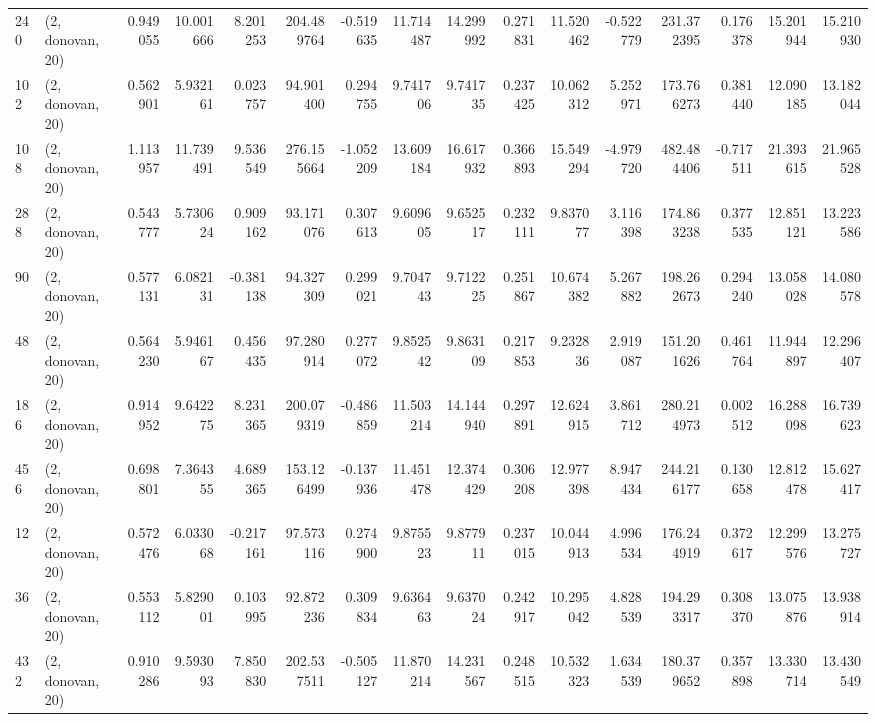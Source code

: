 \begin{tabular}{llrrrrrrrrrrrrrr}
240 &  (2, donovan, 20) &   0.949055 &  10.001666 &   8.201253 &   204.489764 &  -0.519635 &  11.714487 &  14.299992 &  0.271831 &  11.520462 &  -0.522779 &   231.372395 &   0.176378 &  15.201944 &  15.210930 \\
102 &  (2, donovan, 20) &   0.562901 &   5.932161 &   0.023757 &    94.901400 &   0.294755 &   9.741706 &   9.741735 &  0.237425 &  10.062312 &   5.252971 &   173.766273 &   0.381440 &  12.090185 &  13.182044 \\
108 &  (2, donovan, 20) &   1.113957 &  11.739491 &   9.536549 &   276.155664 &  -1.052209 &  13.609184 &  16.617932 &  0.366893 &  15.549294 &  -4.979720 &   482.484406 &  -0.717511 &  21.393615 &  21.965528 \\
288 &  (2, donovan, 20) &   0.543777 &   5.730624 &   0.909162 &    93.171076 &   0.307613 &   9.609605 &   9.652517 &  0.232111 &   9.837077 &   3.116398 &   174.863238 &   0.377535 &  12.851121 &  13.223586 \\
90  &  (2, donovan, 20) &   0.577131 &   6.082131 &  -0.381138 &    94.327309 &   0.299021 &   9.704743 &   9.712225 &  0.251867 &  10.674382 &   5.267882 &   198.262673 &   0.294240 &  13.058028 &  14.080578 \\
48  &  (2, donovan, 20) &   0.564230 &   5.946167 &   0.456435 &    97.280914 &   0.277072 &   9.852542 &   9.863109 &  0.217853 &   9.232836 &   2.919087 &   151.201626 &   0.461764 &  11.944897 &  12.296407 \\
186 &  (2, donovan, 20) &   0.914952 &   9.642275 &   8.231365 &   200.079319 &  -0.486859 &  11.503214 &  14.144940 &  0.297891 &  12.624915 &   3.861712 &   280.214973 &   0.002512 &  16.288098 &  16.739623 \\
456 &  (2, donovan, 20) &   0.698801 &   7.364355 &   4.689365 &   153.126499 &  -0.137936 &  11.451478 &  12.374429 &  0.306208 &  12.977398 &   8.947434 &   244.216177 &   0.130658 &  12.812478 &  15.627417 \\
12  &  (2, donovan, 20) &   0.572476 &   6.033068 &  -0.217161 &    97.573116 &   0.274900 &   9.875523 &   9.877911 &  0.237015 &  10.044913 &   4.996534 &   176.244919 &   0.372617 &  12.299576 &  13.275727 \\
36  &  (2, donovan, 20) &   0.553112 &   5.829001 &   0.103995 &    92.872236 &   0.309834 &   9.636463 &   9.637024 &  0.242917 &  10.295042 &   4.828539 &   194.293317 &   0.308370 &  13.075876 &  13.938914 \\
432 &  (2, donovan, 20) &   0.910286 &   9.593093 &   7.850830 &   202.537511 &  -0.505127 &  11.870214 &  14.231567 &  0.248515 &  10.532323 &   1.634539 &   180.379652 &   0.357898 &  13.330714 &  13.430549 \\

\end{tabular}
